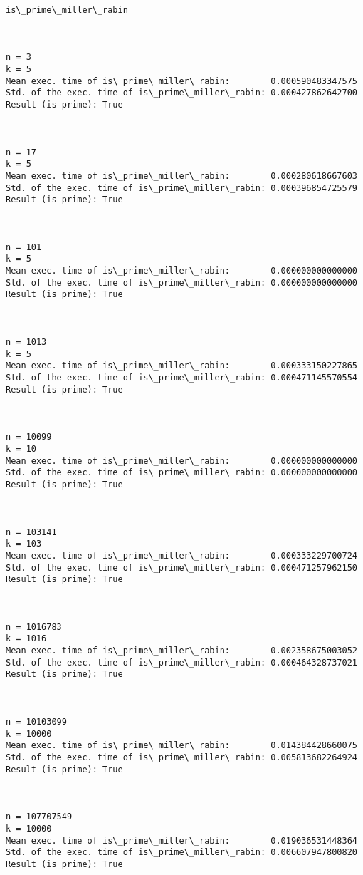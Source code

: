 \documentclass[11pt]{article}
\begin{document}
    \begin{Verbatim}[commandchars=\\\{\}]

is\_prime\_miller\_rabin



n = 3
k = 5
Mean exec. time of is\_prime\_miller\_rabin:        0.000590483347575
Std. of the exec. time of is\_prime\_miller\_rabin: 0.000427862642700
Result (is prime): True



n = 17
k = 5
Mean exec. time of is\_prime\_miller\_rabin:        0.000280618667603
Std. of the exec. time of is\_prime\_miller\_rabin: 0.000396854725579
Result (is prime): True



n = 101
k = 5
Mean exec. time of is\_prime\_miller\_rabin:        0.000000000000000
Std. of the exec. time of is\_prime\_miller\_rabin: 0.000000000000000
Result (is prime): True



n = 1013
k = 5
Mean exec. time of is\_prime\_miller\_rabin:        0.000333150227865
Std. of the exec. time of is\_prime\_miller\_rabin: 0.000471145570554
Result (is prime): True



n = 10099
k = 10
Mean exec. time of is\_prime\_miller\_rabin:        0.000000000000000
Std. of the exec. time of is\_prime\_miller\_rabin: 0.000000000000000
Result (is prime): True



n = 103141
k = 103
Mean exec. time of is\_prime\_miller\_rabin:        0.000333229700724
Std. of the exec. time of is\_prime\_miller\_rabin: 0.000471257962150
Result (is prime): True



n = 1016783
k = 1016
Mean exec. time of is\_prime\_miller\_rabin:        0.002358675003052
Std. of the exec. time of is\_prime\_miller\_rabin: 0.000464328737021
Result (is prime): True



n = 10103099
k = 10000
Mean exec. time of is\_prime\_miller\_rabin:        0.014384428660075
Std. of the exec. time of is\_prime\_miller\_rabin: 0.005813682264924
Result (is prime): True



n = 107707549
k = 10000
Mean exec. time of is\_prime\_miller\_rabin:        0.019036531448364
Std. of the exec. time of is\_prime\_miller\_rabin: 0.006607947800820
Result (is prime): True




\end{Verbatim}
\end{document}
